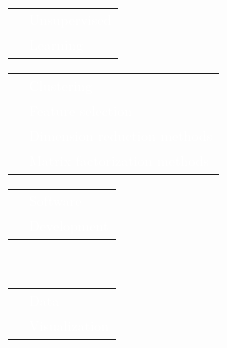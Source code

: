 \documentclass[letterpaper]{article}
\begin{document}
\begin{minipage}{1.\linewidth}
{\begin{minipage}{0.47\linewidth}
\begin{minipage}{1\linewidth}
\begin{minipage}{0.47\linewidth}
\begin{minipage}{1\linewidth}
{				} 
			\end{minipage}
			\vspace{2ex}
		\end{minipage}
	\end{minipage}\\ %
	\begin{minipage}{1\linewidth} %
		\begin{minipage}{0.47\linewidth}
			\begin{tabularx}{1\textwidth}{rX}
				& \Large\textmd{\textcolor{white}{Unsupervised}}\\
				& \Large\textmd{\textcolor{white}{Learning}}\\
			\end{tabularx}
			\vspace{1ex}
			\begin{minipage}{1\linewidth}
				\small\textcolor{white}{
				\begin{tabularx}{1\textwidth}{cX}
					& Clustering\\
					& Feature selection\\
					& Dimension reduction methods\\
					& Matrix factorization methods\\
				\end{tabularx}
				} 
			\end{minipage}
			\vspace{2ex}
		\end{minipage}
		\hfill
		\begin{minipage}{0.47\linewidth}
			\begin{tabularx}{1\textwidth}{rX}
				& \Large\textmd{\textcolor{white}{Software}}\\
				& \Large\textmd{\textcolor{white}{Development}}\\
			\end{tabularx}
		\end{minipage}
	\end{minipage}\\
	\begin{minipage}{1\linewidth} %
		\begin{minipage}{0.47\linewidth}
			\begin{tabularx}{1\textwidth}{rX}
				& \Large\textmd{\textcolor{white}{Data}}\\
				& \Large\textmd{\textcolor{white}{Visualization}}\\
			\end{tabularx}
		\vspace{1ex}

\end{minipage}
\end{minipage}
\end{minipage}}
\end{minipage}
\end{document}
